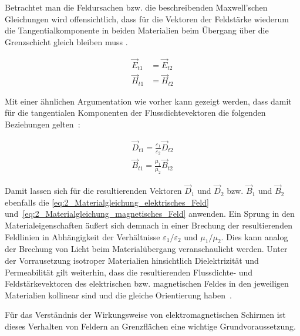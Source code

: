 Betrachtet man die Feldursachen bzw. die beschreibenden Maxwell'schen Gleichungen wird offensichtlich, dass für die Vektoren der Feldstärke wiederum die Tangentialkomponente in beiden Materialien beim Übergang über die Grenzschicht gleich bleiben muss \cite{EM_Schirmung}. 

\begin{subequations}
\begin{align}
    \vec E_{t1} &= \vec E_{t2} \label{subeq:2_Feldstaerketangentiale1} \\
    \vec H_{t1} &= \vec H_{t2} \label{subeq:2_Feldstaerketangentiale2}
    \end{align}
\label{eq:2_Feldstaerketangentiale}
\end{subequations}

Mit einer ähnlichen Argumentation wie vorher kann gezeigt werden, dass damit für die tangentialen Komponenten der Flussdichtevektoren die folgenden Beziehungen gelten~\cite{EM_Schirmung}:

\begin{subequations}
\begin{align}
    \vec D_{t1} = \frac{\varepsilon_1}{\varepsilon_2} \vec D_{t2} \label{subeq:2_Flussdichtetangentiale1} \\
    \vec B_{t1} = \frac{\mu_1}{\mu_2} \vec B_{t2} \label{subeq:2_Flussdichtetangentiale2}
\end{align}
\label{eq:2_Flussdichtetangentiale}
\end{subequations}

Damit lassen sich für die resultierenden Vektoren $\vec D_1$ und $\vec D_2$ bzw. $\vec B_1$ und $\vec B_2$ ebenfalls die \Gleichungen\eqref{eq:2_Materialgleichung_elektrisches_Feld} und~\eqref{eq:2_Materialgleichung_magnetisches_Feld} anwenden. Ein Sprung in den Materialeigenschaften äußert sich demnach in einer Brechung der resultierenden Feldlinien in Abhängigkeit der Verhältnisse $\varepsilon_1 / \varepsilon_2$ und $\mu_1 / \mu_2$. Dies kann analog der Brechung von Licht beim Materialübergang veranschaulicht werden. Unter der Vorrausetzung isotroper Materialien hinsichtlich Dielektrizität und Permeabilität gilt weiterhin, dass die resultierenden Flussdichte- und Feldstärkevektoren des elektrischen bzw. magnetischen Feldes in den jeweiligen Materialien kollinear sind und die gleiche Orientierung haben~\cite{EM_Schirmung}.

\par
\vspace{\linespace}

Für das Verständnis der Wirkungsweise von elektromagnetischen Schirmen ist dieses Verhalten von Feldern an Grenzflächen eine wichtige Grundvoraussetzung. 
















